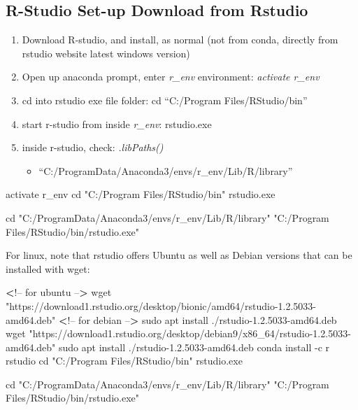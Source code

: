 \documentclass[]{article}
\newenvironment{Shaded}{\begin{snugshade}}{\end{snugshade}}
\newcommand{\BuiltInTok}[1]{#1}
\newcommand{\ExtensionTok}[1]{#1}
\newcommand{\FunctionTok}[1]{\textcolor[rgb]{0.00,0.00,0.00}{#1}}
\newcommand{\NormalTok}[1]{#1}
\newcommand{\OperatorTok}[1]{\textcolor[rgb]{0.81,0.36,0.00}{\textbf{#1}}}
\newcommand{\StringTok}[1]{\textcolor[rgb]{0.31,0.60,0.02}{#1}}
\providecommand{\tightlist}{%
  \setlength{\itemsep}{0pt}\setlength{\parskip}{0pt}}
\begin{document}
\hypertarget{r-studio-set-up-download-from-rstudio}{%
\subsection{R-Studio Set-up Download from
Rstudio}\label{r-studio-set-up-download-from-rstudio}}

\begin{enumerate}
\def\labelenumi{\arabic{enumi}.}
\tightlist
\item
  Download R-studio, and install, as normal (not from conda, directly
  from rstudio website latest windows version)
\item
  Open up anaconda prompt, enter \emph{r\_env} environment:
  \emph{activate r\_env}
\item
  cd into rstudio exe file folder: cd ``C:/Program Files/RStudio/bin''
\item
  start r-studio from inside \emph{r\_env}: rstudio.exe
\item
  inside r-studio, check: \emph{.libPaths()}

  \begin{itemize}
  \tightlist
  \item
    ``C:/ProgramData/Anaconda3/envs/r\_env/Lib/R/library''
  \end{itemize}
\end{enumerate}

\begin{Shaded}
\begin{Highlighting}[]
\ExtensionTok{activate}\NormalTok{ r_env}
\BuiltInTok{cd} \StringTok{"C:/Program Files/RStudio/bin"}
\ExtensionTok{rstudio.exe}

\BuiltInTok{cd} \StringTok{"C:/ProgramData/Anaconda3/envs/r_env/Lib/R/library"}
\StringTok{"C:/Program Files/RStudio/bin/rstudio.exe"}
\end{Highlighting}
\end{Shaded}

For linux, note that rstudio offers Ubuntu as well as Debian versions
that can be installed with wget:

\begin{Shaded}
\begin{Highlighting}[]
\OperatorTok{<}\NormalTok{!}\ExtensionTok{--}\NormalTok{ for ubuntu --}\OperatorTok{>}
\FunctionTok{wget} \StringTok{"https://download1.rstudio.org/desktop/bionic/amd64/rstudio-1.2.5033-amd64.deb"}
\OperatorTok{<}\NormalTok{!}\ExtensionTok{--}\NormalTok{ for debian --}\OperatorTok{>}
\FunctionTok{sudo}\NormalTok{ apt install ./rstudio-1.2.5033-amd64.deb}
\FunctionTok{wget} \StringTok{"https://download1.rstudio.org/desktop/debian9/x86_64/rstudio-1.2.5033-amd64.deb"}
\FunctionTok{sudo}\NormalTok{ apt install ./rstudio-1.2.5033-amd64.deb}
\ExtensionTok{conda}\NormalTok{ install -c r rstudio}
\BuiltInTok{cd} \StringTok{"C:/Program Files/RStudio/bin"}
\ExtensionTok{rstudio.exe}

\BuiltInTok{cd} \StringTok{"C:/ProgramData/Anaconda3/envs/r_env/Lib/R/library"}
\StringTok{"C:/Program Files/RStudio/bin/rstudio.exe"}
\end{Highlighting}
\end{Shaded}
\end{document}
